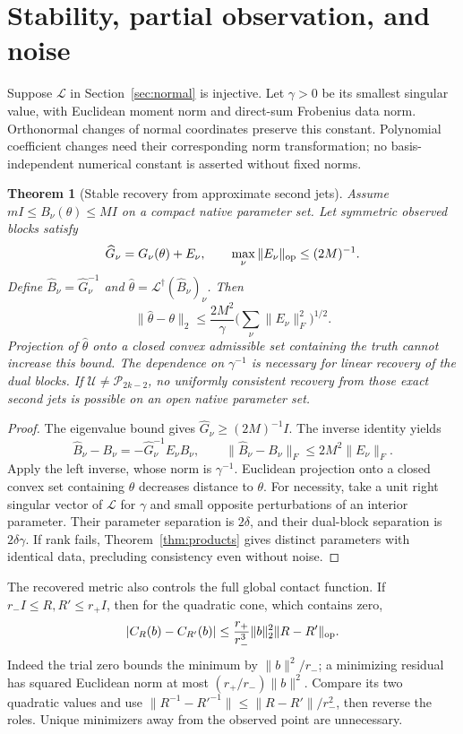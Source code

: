 \documentclass[11pt,reqno]{amsart}
\numberwithin{equation}{section}
\newtheorem{theorem}{Theorem}[section]
\theoremstyle{definition}\newtheorem{definition}[theorem]{Definition}
\theoremstyle{remark}\newtheorem{remark}[theorem]{Remark}
\newcommand{\cP}{\mathcal P}
\newcommand{\cL}{\mathcal L}
\newcommand{\cU}{\mathcal U}
\begin{document}
\section{Stability, partial observation, and noise}\label{sec:stability}
Suppose $\cL$ in Section~\ref{sec:normal} is injective. Let $\gamma>0$ be its smallest singular value, with Euclidean moment norm and direct-sum Frobenius data norm. Orthonormal changes of normal coordinates preserve this constant. Polynomial coefficient changes need their corresponding norm transformation; no basis-independent numerical constant is asserted without fixed norms.

\begin{theorem}[Stable recovery from approximate second jets]\label{thm:stability}
Assume $mI\le B_\nu(\theta)\le MI$ on a compact native parameter set. Let symmetric observed blocks satisfy
\[
 \widehat G_\nu=G_\nu(\theta)+E_\nu,\qquad
 \max_\nu\|E_\nu\|_{\rm op}\le(2M)^{-1}.
\]
Define $\widehat B_\nu=\widehat G_\nu^{-1}$ and $\widehat\theta=\cL^\dagger(\widehat B_\nu)_\nu$. Then
\begin{equation}\label{eq:stability}
 \|\widehat\theta-\theta\|_2
 \le \frac{2M^2}{\gamma}
       \Big(\sum_\nu\|E_\nu\|_F^2\Big)^{1/2}.
\end{equation}
Projection of $\widehat\theta$ onto a closed convex admissible set containing the truth cannot increase this bound. The dependence on $\gamma^{-1}$ is necessary for linear recovery of the dual blocks. If $\cU\ne\cP_{2k-2}$, no uniformly consistent recovery from those exact second jets is possible on an open native parameter set.
\end{theorem}
\begin{proof}
The eigenvalue bound gives $\widehat G_\nu\ge(2M)^{-1}I$. The inverse identity yields
\[
 \widehat B_\nu-B_\nu=-\widehat G_\nu^{-1}E_\nu B_\nu,
 \qquad \|\widehat B_\nu-B_\nu\|_F\le2M^2\|E_\nu\|_F.
\]
Apply the left inverse, whose norm is $\gamma^{-1}$. Euclidean projection onto a closed convex set containing $\theta$ decreases distance to $\theta$. For necessity, take a unit right singular vector of $\cL$ for $\gamma$ and small opposite perturbations of an interior parameter. Their parameter separation is $2\delta$, and their dual-block separation is $2\delta\gamma$. If rank fails, Theorem~\ref{thm:products} gives distinct parameters with identical data, precluding consistency even without noise.
\end{proof}

The recovered metric also controls the full global contact function. If $r_-I\le R,R'\le r_+I$, then for the quadratic cone, which contains zero,
\begin{equation}\label{eq:fullcontact}
 |C_R(b)-C_{R'}(b)|\le\frac{r_+}{r_-^3}\|b\|_2^2\|R-R'\|_{\rm op}.
\end{equation}
Indeed the trial zero bounds the minimum by $\|b\|^2/r_-$; a minimizing residual has squared Euclidean norm at most $(r_+/r_-)\|b\|^2$. Compare its two quadratic values and use $\|R^{-1}-R'^{-1}\|\le\|R-R'\|/r_-^2$, then reverse the roles. Unique minimizers away from the observed point are unnecessary.
\end{document}
